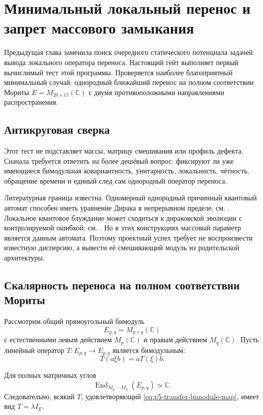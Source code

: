\chapter{Минимальный локальный перенос и запрет массового замыкания}

Предыдущая глава заменила поиск очередного статического потенциала задачей
вывода локального оператора переноса. Настоящий гейт выполняет первый
вычислимый тест этой программы. Проверяется наиболее благоприятный
минимальный случай: однородный ближайший перенос на полном соответствии
Мориты $E=M_{20\times15}(\mathbb C)$ с двумя противоположными направлениями
распространения.

\section{Антикруговая сверка}

Этот тест не подставляет массы, матрицу смешивания или профиль дефекта.
Сначала требуется ответить на более дешёвый вопрос: фиксируют ли уже
имеющиеся бимодульная ковариантность, унитарность, локальность, чётность,
обращение времени и единый след сам однородный оператор переноса.

Литературная граница известна. Одномерный однородный причинный квантовый
автомат способен иметь уравнение Дирака в непрерывном пределе; см.
. Локальное квантовое блуждание может сходиться к
дираковской эволюции с контролируемой ошибкой; см.
. Но в этих конструкциях массовый параметр является
данным автомата. Поэтому проектный успех требует не воспроизвести известную
дисперсию, а вывести её смешивающий модуль из родительской архитектуры.

\section{Скалярность переноса на полном соответствии Мориты}

Рассмотрим общий прямоугольный бимодуль
\begin{equation}
 E_{p,q}=M_{p\times q}(\mathbb C)
\end{equation}
с естественными левым действием $M_p(\mathbb C)$ и правым действием
$M_q(\mathbb C)$. Пусть линейный оператор $T:E_{p,q}\to E_{p,q}$ является
бимодульным:
\begin{equation}
 T(a\xi b)=aT(\xi)b.
 \label{eq:v5-transfer-bimodule-map}
\end{equation}

\begin{lemma}
Для полных матричных углов
\begin{equation}
 \operatorname{End}_{M_p-M_q}(E_{p,q})\simeq\mathbb C.
 \label{eq:v5-full-morita-endomorphism}
\end{equation}
Следовательно, всякий $T$, удовлетворяющий
\eqref{eq:v5-transfer-bimodule-map}, имеет вид $T=\lambda I_E$.
\end{lemma}

